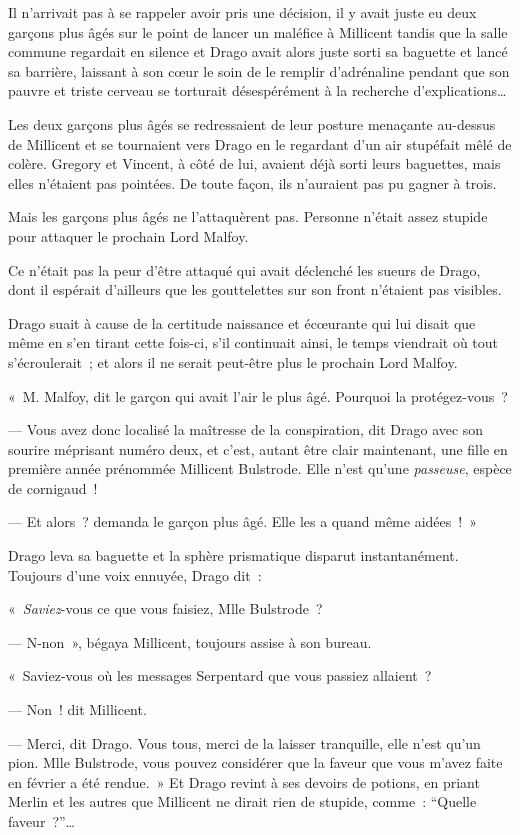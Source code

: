 Il n'arrivait pas à se rappeler avoir pris une décision, il y avait juste eu deux garçons plus âgés sur le point de lancer un maléfice à Millicent tandis que la salle commune regardait en silence et Drago avait alors juste sorti sa baguette et lancé sa barrière, laissant à son cœur le soin de le remplir d'adrénaline pendant que son pauvre et triste cerveau se torturait désespérément à la recherche d'explications…

Les deux garçons plus âgés se redressaient de leur posture menaçante au-dessus de Millicent et se tournaient vers Drago en le regardant d'un air stupéfait mêlé de colère. Gregory et Vincent, à côté de lui, avaient déjà sorti leurs baguettes, mais elles n'étaient pas pointées. De toute façon, ils n'auraient pas pu gagner à trois.

Mais les garçons plus âgés ne l'attaquèrent pas. Personne n'était assez stupide pour attaquer le prochain Lord Malfoy.

Ce n'était pas la peur d'être attaqué qui avait déclenché les sueurs de Drago, dont il espérait d'ailleurs que les gouttelettes sur son front n'étaient pas visibles.

Drago suait à cause de la certitude naissance et écœurante qui lui disait que même en s'en tirant cette fois-ci, s'il continuait ainsi, le temps viendrait où tout s'écroulerait~; et alors il ne serait peut-être plus le prochain Lord Malfoy.

«~M. Malfoy, dit le garçon qui avait l'air le plus âgé. Pourquoi la protégez-vous~?

--- Vous avez donc localisé la maîtresse de la conspiration, dit Drago avec son sourire méprisant numéro deux, et c'est, autant être clair maintenant, une fille en première année prénommée Millicent Bulstrode. Elle n'est qu'une \emph{passeuse}, espèce de cornigaud~!

--- Et alors~? demanda le garçon plus âgé. Elle les a quand même aidées~!~»

Drago leva sa baguette et la sphère prismatique disparut instantanément. Toujours d'une voix ennuyée, Drago dit~:

«~\emph{Saviez}-vous ce que vous faisiez, Mlle Bulstrode~?

--- N-non~», bégaya Millicent, toujours assise à son bureau.

«~Saviez-vous où les messages Serpentard que vous passiez allaient~?

--- Non~! dit Millicent.

--- Merci, dit Drago. Vous tous, merci de la laisser tranquille, elle n'est qu'un pion. Mlle Bulstrode, vous pouvez considérer que la faveur que vous m'avez faite en février a été rendue.~» Et Drago revint à ses devoirs de potions, en priant Merlin et les autres que Millicent ne dirait rien de stupide, comme~: “Quelle faveur~?”…

